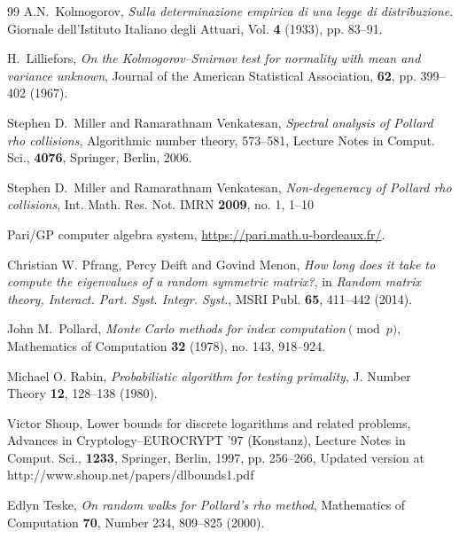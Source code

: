 \documentclass{llncs}
\numberwithin{equation}{section}
\renewcommand\({\left(}
\renewcommand\){\right)}
\begin{document}
\begin{thebibliography}{99}
 A.N.~Kolmogorov, {\it Sulla determinazione empirica di una legge di distribuzione}. Giornale dell'Istituto Italiano degli Attuari, Vol. {\bf 4} (1933), pp. 83--91.


 H.~Lilliefors,  {\it On the Kolmogorov--Smirnov test for normality with mean and variance unknown}, Journal of the American Statistical Association, {\bf 62}, pp. 399--402 (1967).

 Stephen D.~Miller and Ramarathnam Venkatesan, {\it Spectral analysis of Pollard rho collisions},  Algorithmic number theory, 573--581, Lecture Notes in Comput. Sci., {\bf  4076}, Springer, Berlin, 2006.


 Stephen D.~Miller and Ramarathnam Venkatesan, {\it Non-degeneracy of Pollard rho collisions}, Int. Math. Res. Not. IMRN {\bf 2009}, no. 1,  1--10


 Pari/GP computer algebra system, \url{https://pari.math.u-bordeaux.fr/}.


 Christian W. Pfrang, Percy Deift and Govind Menon, {\it How long does it take to compute the eigenvalues of a random symmetric matrix?}, in {\it Random matrix theory, Interact. Part. Syst. Integr. Syst.}, MSRI Publ. {\bf 65}, 411--442 (2014).

 John M.~Pollard, {\it
Monte Carlo methods  for index computation$\pmod p$},
 Mathematics of
Computation
{\bf 32}
(1978), no. 143, 918--924.

 Michael O. Rabin,
  {\it Probabilistic algorithm for testing primality}, J. Number Theory {\bf 12}, 128--138 (1980).

 Victor Shoup,
Lower  bounds  for  discrete  logarithms  and  related  problems, Advances in Cryptology--EUROCRYPT ’97 (Konstanz), Lecture Notes in Comput. Sci., {\bf 1233}, Springer, Berlin, 1997, pp. 256–266,
Updated version at
http://www.shoup.net/papers/dlbounds1.pdf

 Edlyn Teske, {\it On random walks for Pollard's rho method}, Mathematics of Computation
{\bf 70}, Number 234,  809--825 (2000).


\end{thebibliography}
\end{document}
